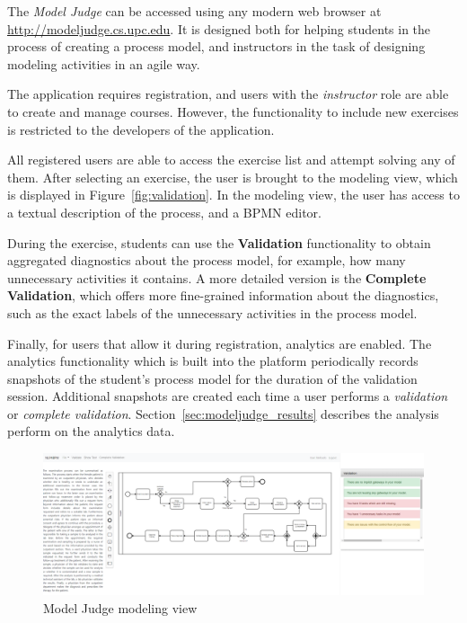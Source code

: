 The \emph{Model Judge} can be accessed using any modern web browser at
\url{http://modeljudge.cs.upc.edu}. It is designed both for helping students in
the process of creating a process model, and instructors in the task of
designing modeling activities in an agile way. 

The application requires registration, and users with the \emph{instructor} role
are able to create and manage courses. However, the functionality to include new
exercises is restricted to the developers of the application.

All registered users are able to access the exercise list and attempt solving
any of them. After selecting an exercise, the user is brought to the modeling
view, which is displayed in Figure~\ref{fig:validation}. In the modeling view,
the user has access to a textual description of the process, and a BPMN editor.

During the exercise, students can use the \textbf{Validation} functionality to
obtain aggregated diagnostics about the process model, for example, how many
unnecessary activities it contains. A more detailed version is the \textbf{Complete
  Validation}, which offers more fine-grained information about the diagnostics,
such as the exact labels of the unnecessary activities in the process model.

Finally, for users that allow it during registration, analytics are enabled. The
analytics functionality which is built into the platform periodically records
snapshots of the student's process model for the duration of the validation
session. Additional snapshots are created each time a user performs a
\textit{validation} or \textit{complete validation}.
Section~\ref{sec:modeljudge_results} describes the analysis perform on the
analytics data.

\begin{figure}[htb]
  \centering
  \includegraphics[width=\textwidth]{figures/validation}
  \caption{Model Judge modeling view}
  \label{fig:modeljudge_validation}
\end{figure}



